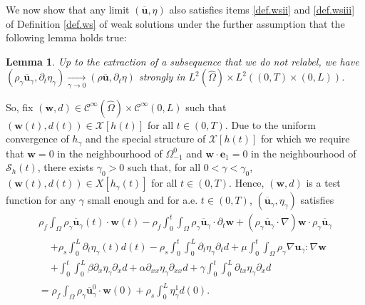 \documentclass[11pt]{article}
\let\mathcal\mathscr
\newtheorem{lemma}[theorem]{Lemma}
\theoremstyle{remark}
\theoremstyle{definition}
\newcommand{\ug}{\boldsymbol{u}}
\newcommand{\wg}{\boldsymbol{w}}
\newcommand{\BS}[1]{\boldsymbol{#1}}
\let\CM\Omega
\newcommand{\CMT}{\widehat{\Omega}}
\begin{document}
We now show that any limit $(\overline{\ug},\eta)$ also satisfies items \eqref{def.wsii} and \eqref{def.wsiii} of Definition \ref{def.ws} of weak solutions under the further assumption that the following lemma holds true:

\begin{lemma}\label{lemma.convergence.L2} Up to the extraction of a subsequence that we do not relabel, we have $(\rho_\gamma\overline{\ug}_{\gamma},\partial_{t}\eta_{\gamma})\underset{\gamma\to 0}{\to}(\rho\overline{\ug},\partial_{t}\eta)$ strongly in $L^{2}(\CMT)\times L^{2}((0, T)\times (0,L))$.
\end{lemma}

So, fix $(\wg, d)\in\mathcal{C}^{\infty}(\CMT)\times \mathcal{C}^{\infty}(0, L) $ such that $(\wg(t), d(t))\in\mathcal{X}[h(t)]$ for all $t\in(0,T)$.
Due to the uniform convergence of $h_\gamma$ and the special structure of $\mathcal{X}[h(t)]$ for which we require that $\wg=0$ in the neighbourhood of $\Omega^0_{-1}$ and $\wg\cdot\BS{e}_{1}=0$ in the neighbourhood of $\mathcal{S}_h(t)$, there exists $\gamma_{0}>0$ such that, for all $0<\gamma<\gamma_{0}$, $(\wg(t),d(t))\in X[h_{\gamma}(t)]$ for all $t\in(0,T)$. Hence, $(\wg,d)$ is a test function for any $\gamma$ small enough and for a.e. $t\in(0,T)$, $(\overline{\ug}_{\gamma},\eta_{\gamma})$ satisfies
\begin{multline}\label{weak.formulation.FS.gamma.limit}
\rho_{f}\int_{\CM}\rho_{\gamma}\overline{\ug}_{\gamma}(t)\cdot\wg(t) -\rho_{f}\int_{0}^{t}\int_{\CM}\rho_{\gamma}\overline{\ug}_{\gamma}\cdot\partial_{t}\wg + (\rho_{\gamma}\overline{\ug}_{\gamma}\cdot\nabla)\wg\cdot\rho_{\gamma}\overline{\ug}_{\gamma}\\
\begin{aligned}
&+\rho_{s}\int_{0}^{L}\partial_{t}\eta_{\gamma}(t)d(t)-\rho_{s}\int_{0}^{t}\int_{0}^{L}\partial_{t}\eta_{\gamma}\partial_{t}d+\mu\int_{0}^{t}\int_{\CM}\rho_{\gamma} \nabla\ug_{\gamma}:\nabla\wg\\
&+\int_{0}^{t}\int_{0}^{L}\beta\partial_{x}\eta_{\gamma}\partial_{x}d + \alpha\partial_{xx}\eta_{\gamma}\partial_{xx}d+\gamma\int_{0}^{t}\int_{0}^{L}\partial_{tx}\eta_{\gamma}\partial_{x}d
\end{aligned}
\\
=\rho_{f}\int_{\CM}\rho_{\gamma}\overline{\ug}^{0}_{\gamma}\cdot\wg(0)+\rho_{s}\int_{0}^{L}\eta^{1}_{\gamma}d(0).
\end{multline}
\end{document}

